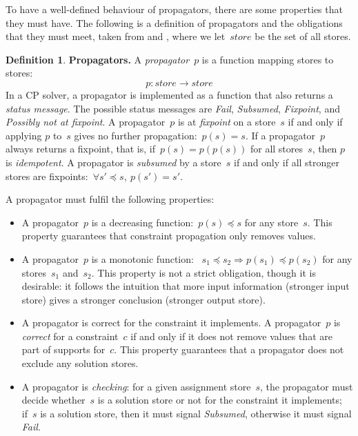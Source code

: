 \documentclass[a4paper,11pt]{article}
\theoremstyle{definition}
\newtheorem{definition}{Definition}
\numberwithin{equation}{section}
\begin{document}
To have a well-defined behaviour of propagators, there are some properties that
they must have. The following is a definition of propagators and the obligations
that they must meet, taken from \cite{SchulteCarlsson:FDsys} and \cite{Gecode:MPG},
where we let~$store$ be the set of all stores.

\begin{definition} \label{def:prop}
  \textbf{Propagators.} A \emph{propagator}~$p$ is a function mapping stores to stores:
  \begin{equation*}
    p: store \to store
  \end{equation*}
  In a CP solver, a propagator is implemented as a function that also returns
  a \emph{status message}.
  The possible status messages are \emph{Fail}, \emph{Subsumed},
  \emph{Fixpoint}, and \emph{Possibly not at fixpoint}.
  A propagator~$p$ is at \emph{fixpoint} on a store~$s$ if and only if applying
  $p$ to~$s$ gives no further propagation:~$p(s) = s$.
  If a propagator~$p$ always returns a fixpoint, that is,
  if~$p(s) = p(p(s))$ for all stores~$s$, then $p$ is \emph{idempotent}.
  A propagator is \emph{subsumed} by a store~$s$ if and only if
  all stronger stores are fixpoints:~$\forall s'\preceq s, \ p(s')=s'$.

  A propagator must fulfil the following properties:

  \begin{itemize}
  \item A propagator~$p$ is a decreasing function:~$p(s) \preceq s$ for any store~$s$.
    This property guarantees that constraint propagation only removes values.

  \item A propagator~$p$ is a monotonic function:
    ~$s_1 \preceq s_2 \Rightarrow p(s_1) \preceq p(s_2)$
    for any stores~$s_1$ and~$s_2$.
    This property is not a strict obligation, though it is desirable:
    it follows the intuition that more input information (stronger input store)
    gives a stronger conclusion (stronger output store).

  \item A propagator is correct for the constraint it implements.
    A propagator~$p$
    is \emph{correct} for a constraint~$c$ if and only if it does not
    remove values that are part of supports for~$c$.
    This property guarantees that a propagator does not exclude any
    solution stores.

  \item A propagator is \emph{checking}: for a given assignment store~$s$, the propagator
    must decide whether~$s$ is a solution store or not for the constraint it
    implements; if~$s$ is a solution store, then it must signal \emph{Subsumed},
    otherwise it must signal \emph{Fail}.


\end{itemize}
\end{definition}
\end{document}
